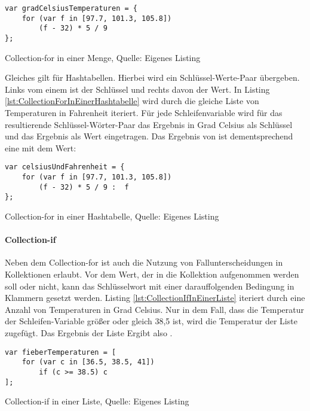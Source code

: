 \ifincludeall
  \begin{listing}[ht]
    \begin{verbatim}
var gradCelsiusTemperaturen = {
    for (var f in [97.7, 101.3, 105.8])
        (f - 32) * 5 / 9
};
\end{verbatim}
    \caption[Collection-for in einer Menge]{Collection-for in einer Menge, Quelle: Eigenes Listing}
    \label{lst:CollectionForInEinerMenge}
  \end{listing}
\fi

Gleiches gilt für Hashtabellen.
Hierbei wird ein Schlüssel-Werte-Paar übergeben.
Links vom einem \IC{:} ist der Schlüssel und rechts davon der Wert.
In Listing \ref{lst:CollectionForInEinerHashtabelle}
wird durch  die gleiche Liste von Temperaturen in Fahrenheit iteriert.
 Für jede Schleifenvariable  wird für das resultierende Schlüssel-Wörter-Paar das Ergebnis in Grad Celsius als Schlüssel und das Ergebnis als Wert eingetragen.
Das Ergebnis von  ist dementsprechend eine  mit dem Wert: 

\ifincludeall
  \begin{listing}[ht]
    \begin{verbatim}
var celsiusUndFahrenheit = {
    for (var f in [97.7, 101.3, 105.8])
        (f - 32) * 5 / 9 :  f
};
\end{verbatim}
    \caption[Collection-for in einer Hashtabelle]{Collection-for in einer Hashtabelle, Quelle: Eigenes Listing}
    \label{lst:CollectionForInEinerHashtabelle}
  \end{listing}
\fi

\paragraph{Collection-if}

Neben dem Collection-for ist auch die Nutzung von Fallunterscheidungen in Kollektionen erlaubt.
Vor dem Wert, der in die Kollektion aufgenommen werden soll oder nicht,  kann  das Schlüsselwort  mit einer darauffolgenden Bedingung in Klammern gesetzt werden.
Listing \ref{lst:CollectionIfInEinerListe} iteriert durch eine Anzahl von Temperaturen in Grad Celsius.
Nur in dem Fall, dass die Temperatur der Schleifen-Variable  größer oder gleich 38,5 ist, wird die Temperatur der Liste zugefügt.
Das Ergebnis der Liste  Ergibt also \IC{[38.5, 41]}.

\ifincludeall
  \begin{listing}[ht]
    \begin{verbatim}
var fieberTemperaturen = [
    for (var c in [36.5, 38.5, 41])
        if (c >= 38.5) c
];
\end{verbatim}
    \caption[Collection-if in einer Liste]{Collection-if in einer Liste, Quelle: Eigenes Listing}
    \label{lst:CollectionIfInEinerListe}
  \end{listing}
\fi


